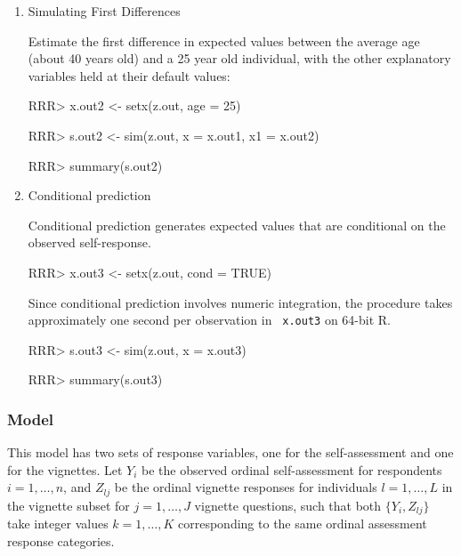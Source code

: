 \begin{enumerate}
\item {Simulating First Differences}

Estimate the first difference in expected values between the average
age (about 40 years old) and a 25 year old individual, with the other
explanatory variables held at their default values:
\begin{Schunk}
\begin{Sinput}
RRR>  x.out2 <- setx(z.out, age = 25)
\end{Sinput}
\end{Schunk}
\begin{Schunk}
\begin{Sinput}
RRR>  s.out2 <- sim(z.out, x = x.out1, x1 = x.out2)
\end{Sinput}
\end{Schunk}
\begin{Schunk}
\begin{Sinput}
RRR>  summary(s.out2)
\end{Sinput}
\end{Schunk}

\item {Conditional prediction}  

Conditional prediction generates expected values that are conditional
on the observed self-response.  
\begin{Schunk}
\begin{Sinput}
RRR> x.out3 <- setx(z.out, cond = TRUE)
\end{Sinput}
\end{Schunk}
Since conditional prediction involves numeric integration, the
procedure takes approximately one second per observation in {\tt
x.out3} on 64-bit R. 
\begin{Schunk}
\begin{Sinput}
RRR> s.out3 <- sim(z.out, x = x.out3)
\end{Sinput}
\end{Schunk}
\begin{Schunk}
\begin{Sinput}
RRR> summary(s.out3)
\end{Sinput}
\end{Schunk}
\end{enumerate}

\subsubsection{Model}

This model has two sets of response variables, one for the
self-assessment and one for the vignettes.  Let $Y_i$ be the observed
ordinal self-assessment for respondents $i = 1, \dots, n$, and
$Z_{lj}$ be the ordinal vignette responses for individuals $l = 1,
\dots, L$ in the vignette subset for $j = 1, \dots, J$ vignette
questions, such that both $\{Y_i, Z_{lj} \}$ take integer values $k
= 1, \dots, K$ corresponding to the same ordinal assessment response categories.


